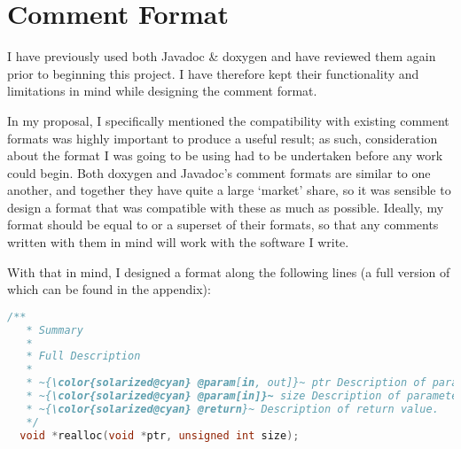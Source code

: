\section{Comment Format}
I have previously used both Javadoc \& doxygen and have reviewed them again
prior to beginning this project. I have therefore kept their functionality and
limitations in mind while designing the comment format.

In my proposal, I specifically mentioned the compatibility with existing comment
formats was highly important to produce a useful result; as such, consideration
about the format I was going to be using had to be undertaken before any work
could begin. Both doxygen and Javadoc's comment formats are similar to one
another, and together they have quite a large `market' share, so it was sensible
to design a format that was compatible with these as much as possible. Ideally,
my format should be equal to or a superset of their formats, so that any
comments written with them in mind will work with the software I write.

With that in mind, I designed a format along the following lines (a full version
of which can be found in the appendix):

\begin{lstlisting}[language=c, escapechar=~]
  /**
   * Summary
   *
   * Full Description
   *
   * ~{\color{solarized@cyan} @param[in, out]}~ ptr Description of parameter ptr
   * ~{\color{solarized@cyan} @param[in]}~ size Description of parameter size
   * ~{\color{solarized@cyan} @return}~ Description of return value.
   */
  void *realloc(void *ptr, unsigned int size);
\end{lstlisting}

